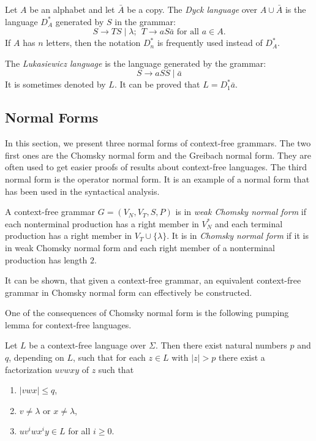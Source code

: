 Let $A$ be an alphabet and let $\bar{A}$ be a copy. The \emph{Dyck language} over $A \cup \bar{A}$ is the language $D^*_A$ generated by $S$ in the grammar:
$$S \to TS \mid \lambda; \ \ T \to a S \bar{a} \text{ for all } a \in A.$$
If $A$ has $n$ letters, then the notation $D^*_n$ is frequently used instead of $D^*_A$.

The \emph{Lukasiewicz language} is the language generated by the grammar:
$$S \to aSS \mid \bar{a}$$ It is sometimes denoted by $L$. It can be proved that $L = D^*_1 \bar{a}$.

\subsection{Normal Forms}
\label{subsection:context-free-normal-forms}

In this section, we present three normal forms of context-free grammars. The two first ones are the  Chomsky normal form and the Greibach normal form. They are often used to get easier proofs of results about context-free languages. The third normal form is the operator normal form. It is an example of a normal form that has been used in the syntactical analysis.

A context-free grammar $G = (V_N, V_T, S, P)$ is in \emph{weak Chomsky normal form} if each nonterminal production has a right member in $V_N^*$ and each terminal production has a right member in $V_T \cup \{\lambda\}$. It is in \emph{Chomsky normal form} if it is in weak Chomsky normal form and each right member of a nonterminal production has length $2$.

It can be shown, that given a context-free grammar, an equivalent context-free grammar in Chomsky normal form can effectively be constructed.

One of the consequences of Chomsky normal form is the following pumping lemma for context-free languages.

\begin{lemma}
Let $L$ be a context-free language over $\Sigma$. Then there exist natural numbers $p$ and $q$, depending on $L$, such that for each $z \in L$ with $|z| > p$ there exist a factorization $u v w x y$ of $z$ such that
\begin{enumerate}
\item $|vwx| \le q$,
\item $v \neq \lambda$ or $x \neq \lambda$,
\item $u v^i w x^i y \in L$ for all $i \ge 0$.
\end{enumerate}
\end{lemma}

